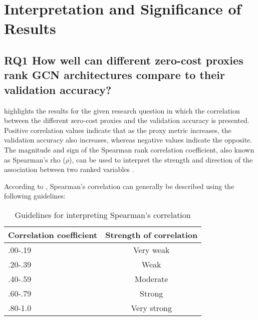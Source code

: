 \section{Interpretation and Significance of Results}

\begin{comment}
\subsection{Research Questions}
\end{comment}

\subsection{RQ1 How well can different zero-cost proxies rank GCN architectures compare to their validation accuracy?}

 highlights the results for the given research question in which the correlation between the different zero-cost proxies and the validation accuracy is presented. Positive correlation values indicate that as the proxy metric increases, the validation accuracy also increases, whereas negative values indicate the opposite. The magnitude and sign of the Spearman rank correlation coefficient, also known as Spearman's rho (\(\rho\)), can be used to interpret the strength and direction of the association between two ranked variables \autocite{pallant2016spss}.

According to \cite{spear}, Spearman's correlation can generally be described using the following guidelines:

\begin{table}[h]
\caption{Guidelines for interpreting Spearman's correlation}
\centering
\begin{tabular}{lc}
\textbf{Correlation coefficient} & \textbf{Strength of correlation} \\ \hline
\multicolumn{1}{l|}{.00-.19} & Very weak \\
\multicolumn{1}{l|}{\cellcolor{verylightgray}.20-.39} & \cellcolor{verylightgray}Weak \\
\multicolumn{1}{l|}{.40-.59} & Moderate \\
\multicolumn{1}{l|}{\cellcolor{verylightgray}.60-.79} & \cellcolor{verylightgray}Strong \\
\multicolumn{1}{l|}{.80-1.0} & Very strong \\
\end{tabular}
\label{tab:correlation}
\end{table}

